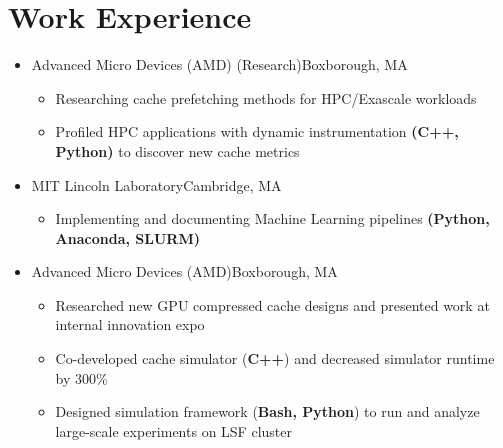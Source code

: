 \documentclass[11pt,letterpaper,sans]{moderncv}
\begin{document}
\section{Work Experience}

\vspace{1pt}

\begin{itemize}

\item[] {
{Advanced Micro Devices (AMD) (Research)}{Boxborough, MA}{}{\vspace{1pt}}
\vspace{-8pt}	\begin{itemize}
	 \item Researching cache prefetching methods for HPC/Exascale workloads
	 \item Profiled HPC applications with dynamic instrumentation \textbf{(C++, Python)} to discover new cache metrics
	\end{itemize}
}
\vspace{6pt}


\item[] {
{MIT Lincoln Laboratory}{Cambridge, MA}{}{\vspace{1pt}}
\vspace{-8pt}	\begin{itemize}
	 \item Implementing and documenting Machine Learning pipelines \textbf{(Python, Anaconda, SLURM)}
	\end{itemize}
}
\vspace{6pt}

\item[] {
{Advanced Micro Devices (AMD)}{Boxborough, MA}{}{\vspace{1pt}}
\vspace{-8pt}	\begin{itemize}
	 \item Researched new GPU compressed cache designs and presented work at internal innovation expo
	 \item Co-developed cache simulator (\textbf{C++}) and decreased simulator runtime by 300\%
	 \item Designed simulation framework (\textbf{Bash, Python}) to run and analyze large-scale experiments on LSF cluster
	\end{itemize}
}
\vspace{6pt}


\end{itemize}
\end{document}
